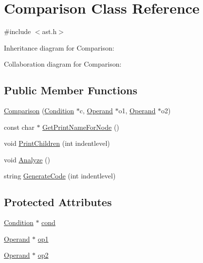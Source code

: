 \hypertarget{class_comparison}{}\section{Comparison Class Reference}
\label{class_comparison}


{\ttfamily \#include $<$ast.\+h$>$}



Inheritance diagram for Comparison\+:


Collaboration diagram for Comparison\+:
\subsection*{Public Member Functions}
\begin{DoxyCompactItemize}
\item 
\hyperlink{class_comparison_ad036df7f73d03fb4b9b6f39a9084be28}{Comparison} (\hyperlink{class_condition}{Condition} $\ast$c, \hyperlink{class_operand}{Operand} $\ast$o1, \hyperlink{class_operand}{Operand} $\ast$o2)
\item 
const char $\ast$ \hyperlink{class_comparison_ae861c70b6cd3696f029139ca8751e8bc}{Get\+Print\+Name\+For\+Node} ()
\item 
void \hyperlink{class_comparison_a2c25039240b003ae6ac1e4d755ae1506}{Print\+Children} (int indentlevel)
\item 
void \hyperlink{class_comparison_a4f77494c5f58ec539b190352455a71fb}{Analyze} ()
\item 
string \hyperlink{class_comparison_a7f806a596494ef371aea077da8050ce4}{Generate\+Code} (int indentlevel)
\end{DoxyCompactItemize}
\subsection*{Protected Attributes}
\begin{DoxyCompactItemize}
\item 
\hyperlink{class_condition}{Condition} $\ast$ \hyperlink{class_comparison_a165789104c56602d693fc2ee7c6aa51f}{cond}
\item 
\hyperlink{class_operand}{Operand} $\ast$ \hyperlink{class_comparison_a516dcc2bb9e7252455f0da7d0016cbb9}{op1}
\item 
\hyperlink{class_operand}{Operand} $\ast$ \hyperlink{class_comparison_afe75ca77cb68dce89fe5d3f542aa7c17}{op2}
\end{DoxyCompactItemize}


